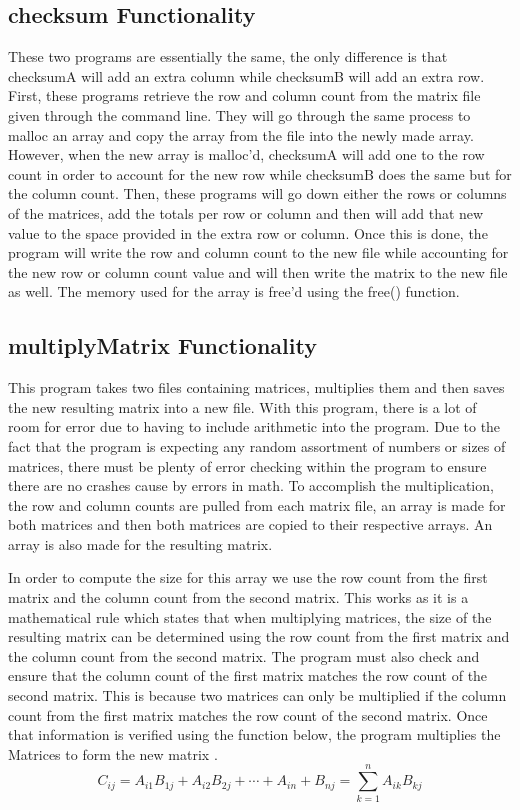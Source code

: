 \documentclass{article}
\begin{document}
\begin{multicols}{2}
    \subsection{checksum Functionality}\label{subsec:checksumABFunc}
    These two programs are essentially the same, the only difference is that checksumA will add an extra column while checksumB will add an extra row.
    First, these programs retrieve the row and column count from the matrix file given through the command line. They will go through the same process
    to malloc an array and copy the array from the file into the newly made array. However, when the new array is malloc'd, checksumA will add one to
    the row count in order to account for the new row while checksumB does the same but for the column count. Then, these programs will go down either
    the rows or columns of the matrices, add the totals per row or column and then will add that new value to the space provided in the extra row or column.
    Once this is done, the program will write the row and column count to the new file while accounting for the new row or column count value and will
    then write the matrix to the new file as well. The memory used for the array is free'd using the free() function. 
    \subsection{multiplyMatrix Functionality}\label{subsec:multiplyMatrixFunc} 
    This program takes two files containing matrices, multiplies them and then saves the new resulting matrix into a new file. With this program, there is
    a lot of room for error due to having to include arithmetic into the program. Due to the fact that the program is expecting any random assortment of 
    numbers or sizes of matrices, there must be plenty of error checking within the program to ensure there are no crashes cause by errors in math. To
    accomplish the multiplication, the row and column counts are pulled from each matrix file, an array is made for both matrices and then both matrices are
    copied to their respective arrays. An array is also made for the resulting matrix. 
    
    In order to compute the size for this array we use the row count from the 
    first matrix and the column count from the second matrix. This works as it is a mathematical rule which states that when multiplying matrices, the size of
    the resulting matrix can be determined using the row count from the first matrix and the column count from the second matrix. The program must also check
    and ensure that the column count of the first matrix matches the row count of the second matrix. This is because two matrices can only be multiplied
    if the column count from the first matrix matches the row count of the second matrix. Once that information is verified using the function below, the
    program multiplies the Matrices to form the new matrix \cite[]{jidan}.
    $$ C_{ij}= A_{i1} B_{1j} + A_{i2} B_{2j} +\cdots+ A_{in} + B_{nj} = \sum_{k=1}^n A_{ik}B_{kj} $$ 


\end{multicols}
\end{document}
